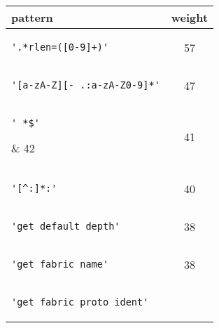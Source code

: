 \begin{table*}
\begin{center}
\begin{tabular}{lc}
\toprule
pattern & weight \\ 
\midrule
\begin{minipage}{2.3in}
\begin{verbatim}
'.*rlen=([0-9]+)'\end{verbatim}
\end{minipage}
& 57 \\ 
\midrule
\begin{minipage}{2.3in}
\begin{verbatim}
'[a-zA-Z][-_.:a-zA-Z0-9]*'\end{verbatim}
\end{minipage}
& 47 \\ 
\midrule
\begin{minipage}{2.3in}
\begin{verbatim}
' *$'\end{verbatim}
\end{minipage}
& 42 \\ 
\midrule
\begin{minipage}{2.3in}
\begin{verbatim}
'^[ ]*(#.*)?$'\end{verbatim}
\end{minipage}
& 41 \\ 
\midrule
\begin{minipage}{2.3in}
\begin{verbatim}
'[^:]*:'\end{verbatim}
\end{minipage}
& 40 \\ 
\midrule
\begin{minipage}{2.3in}
\begin{verbatim}
'get_default_depth'\end{verbatim}
\end{minipage}
& 38 \\ 
\midrule
\begin{minipage}{2.3in}
\begin{verbatim}
'get_fabric_name'\end{verbatim}
\end{minipage}
& 38 \\ 
\midrule
\begin{minipage}{2.3in}
\begin{verbatim}
'get_fabric_proto_ident'\end{verbatim}
\end{minipage}

\end{tabular}
\end{center}
\end{table*}
